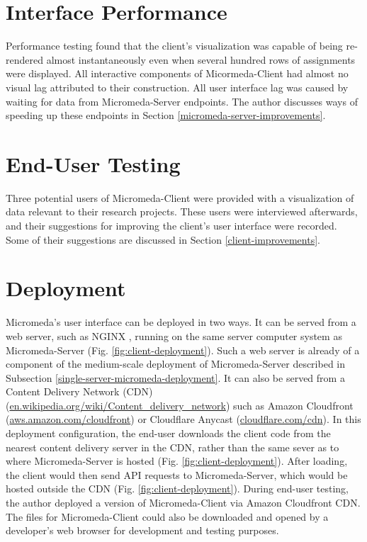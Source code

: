 \section{Interface Performance}

Performance testing found that the client's visualization was capable of being re-rendered almost instantaneously even when several hundred rows of assignments were displayed. All interactive components of Micormeda-Client had almost no visual lag attributed to their construction. All user interface lag was caused by waiting for data from Micromeda-Server endpoints. The author discusses ways of speeding up these endpoints in Section \ref{micromeda-server-improvements}.

\section{End-User Testing}

Three potential users of Micromeda-Client were provided with a visualization of data relevant to their research projects. These users were interviewed afterwards, and their suggestions for improving the client's user interface were recorded. Some of their suggestions are discussed in Section \ref{client-improvements}. 

\section{Deployment}

Micromeda's user interface can be deployed in two ways. It can be served from a web server, such as NGINX \cite{reese2008nginx}, running on the same server computer system as Micromeda-Server (Fig. \ref{fig:client-deployment}). Such a web server is already of a component of the medium-scale deployment of Micromeda-Server described in Subsection \ref{single-server-micromeda-deployment}. It can also be served from a Content Delivery Network (CDN) \cite{farber2003internet} (\href{en.wikipedia.org/wiki/Content\_delivery\_network}{en.wikipedia.org/wiki/Content\_delivery\_network}) such as Amazon Cloudfront \cite{varia2014overview} (\href{aws.amazon.com/cloudfront}{aws.amazon.com/cloudfront}) or Cloudflare Anycast \cite{calder2015analyzing} (\href{cloudflare.com/cdn}{cloudflare.com/cdn}). In this deployment configuration, the end-user downloads the client code from the nearest content delivery server in the CDN, rather than the same sever as to where Micromeda-Server is hosted (Fig. \ref{fig:client-deployment}). After loading, the client would then send API requests to Micromeda-Server, which would be hosted outside the CDN (Fig. \ref{fig:client-deployment}). During end-user testing, the author deployed a version of Micromeda-Client via Amazon Cloudfront CDN. The files for Micromeda-Client could also be downloaded and opened by a developer's web browser for development and testing purposes.

